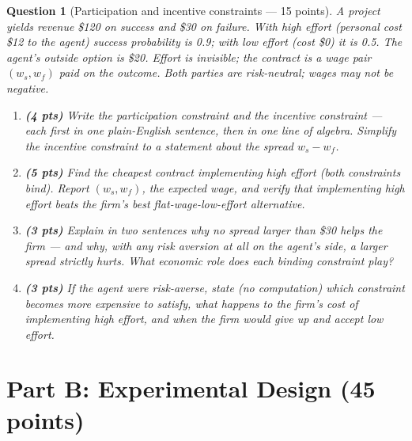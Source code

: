 \documentclass[11pt]{article}
\newtheorem{question}{Question}
\begin{document}
\begin{question}[Participation and incentive constraints --- 15 points]
A project yields revenue \$120 on success and \$30 on failure. With high
effort (personal cost \$12 to the agent) success probability is 0.9; with
low effort (cost \$0) it is 0.5. The agent's outside option is \$20.
Effort is invisible; the contract is a wage pair $(w_s, w_f)$ paid on the
outcome. Both parties are risk-neutral; wages may not be negative.

\begin{enumerate}[label=(\alph*)]
  \item \textbf{(4 pts)} Write the participation constraint and the
        incentive constraint --- each first in one plain-English
        sentence, then in one line of algebra. Simplify the incentive
        constraint to a statement about the spread $w_s - w_f$.
  \item \textbf{(5 pts)} Find the cheapest contract implementing high
        effort (both constraints bind). Report $(w_s, w_f)$, the expected
        wage, and verify that implementing high effort beats the firm's
        best flat-wage-low-effort alternative.
  \item \textbf{(3 pts)} Explain in two sentences why no spread larger
        than \$30 helps the firm --- and why, with any risk aversion at
        all on the agent's side, a larger spread strictly hurts. What
        economic role does each binding constraint play?
  \item \textbf{(3 pts)} If the agent were risk-averse, state (no
        computation) which constraint becomes more expensive to satisfy,
        what happens to the firm's cost of implementing high effort, and
        when the firm would give up and accept low effort.
\end{enumerate}
\end{question}

\section*{Part B: Experimental Design (45 points)}
\end{document}
